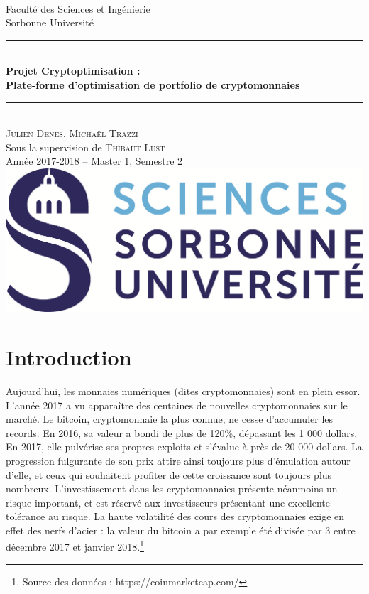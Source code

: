 \documentclass[a4paper]{article}
\newcommand{\HRule}{\rule{\linewidth}{0.5mm}}
\begin{document}
\begin{titlepage}
\begin{center}
~\\[1cm]
\Large Faculté des Sciences et Ingénierie\\Sorbonne Université\\[3.5cm]
\HRule 
\\[0.4cm]{\huge \bfseries Projet Cryptoptimisation :\\[0.1cm] Plate-forme d’optimisation de portfolio de cryptomonnaies\\[0.4cm]}
\HRule \\[1cm] 
\Large \textsc{Julien Denes, Michaël Trazzi} \\[0.1cm]
\Large Sous la supervision de \textsc{Thibaut Lust}\\[2cm]
\Large Année 2017-2018 -- Master 1, Semestre 2 \\[4cm]
\includegraphics[scale=0.3]{logo.png}
\end{center}
\end{titlepage}


\section*{Introduction}

Aujourd’hui, les monnaies numériques (dites cryptomonnaies) sont en plein essor. L'année 2017 a vu apparaître des centaines de nouvelles cryptomonnaies sur le marché. Le bitcoin, cryptomonnaie la plus connue, ne cesse d’accumuler les records. En 2016, sa valeur a bondi de plus de 120\%, dépassant les 1 000 dollars. En 2017, elle pulvérise ses propres exploits et s'évalue à près de 20 000 dollars. La progression fulgurante de son prix attire ainsi toujours plus d'émulation autour d'elle, et ceux qui souhaitent profiter de cette croissance sont toujours plus nombreux. L’investissement dans les cryptomonnaies présente néanmoins un risque important, et est réservé aux investisseurs présentant une excellente tolérance au risque. La haute volatilité des cours des cryptomonnaies exige en effet des nerfs d’acier : la valeur du bitcoin a par exemple été divisée par 3 entre décembre 2017 et janvier 2018.\footnote{Source des données : https://coinmarketcap.com/}
\end{document}

